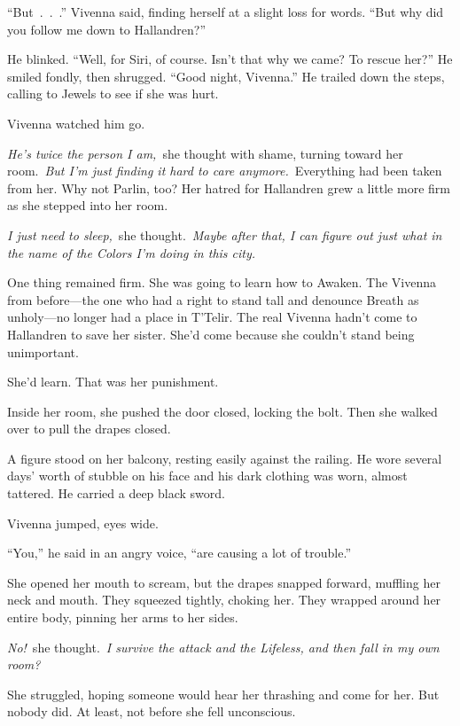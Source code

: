 “But~.~.~.” Vivenna said, finding herself at a slight loss for words. “But why did you follow me down to Hallandren?”

He blinked. “Well, for Siri, of course. Isn’t that why we came? To rescue her?” He smiled fondly, then shrugged. “Good night, Vivenna.” He trailed down the steps, calling to Jewels to see if she was hurt.

Vivenna watched him go.

\textit{He’s twice the person I am,}~she thought with shame, turning toward her room.~\textit{But I’m just finding it hard to care anymore.}~Everything had been taken from her. Why not Parlin, too? Her hatred for Hallandren grew a little more firm as she stepped into her room.

\textit{I just need to sleep,}~she thought.~\textit{Maybe after that, I can figure out just what in the name of the Colors I’m doing in this city.}

One thing remained firm. She was going to learn how to Awaken. The Vivenna from before—the one who had a right to stand tall and denounce Breath as unholy—no longer had a place in T’Telir. The real Vivenna hadn’t come to Hallandren to save her sister. She’d come because she couldn’t stand being unimportant.

She’d learn. That was her punishment.

Inside her room, she pushed the door closed, locking the bolt. Then she walked over to pull the drapes closed.

A figure stood on her balcony, resting easily against the railing. He wore several days’ worth of stubble on his face and his dark clothing was worn, almost tattered. He carried a deep black sword.

Vivenna jumped, eyes wide.

“You,” he said in an angry voice, “are causing a lot of trouble.”

She opened her mouth to scream, but the drapes snapped forward, muffling her neck and mouth. They squeezed tightly, choking her. They wrapped around her entire body, pinning her arms to her sides.

\textit{No!}~she thought.~\textit{I survive the attack and the Lifeless, and then fall in my own room?}

She struggled, hoping someone would hear her thrashing and come for her. But nobody did. At least, not before she fell unconscious.

